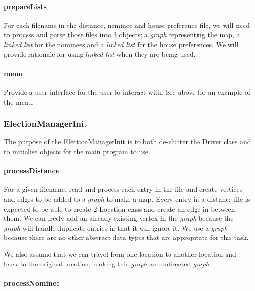 \documentclass[a4paper, 12pt, titlepage]{article}
\begin{document}
\paragraph{prepareLists} \hspace{0pt}

For each filename in the distance, nominee and house preference file, we
will need to process and parse those files into 3 objects; a \textit{graph}
representing the map, a \textit{linked list} for the nominees and a
\textit{linked list} for the house preferences. We will provide rationale
for using \textit{linked list} when they are being used.

\paragraph{menu} \hspace{0pt}

Provide a user interface for the user to interact with. See above for
an example of the menu.

\newpage

\subsubsection{ElectionManagerInit}

The purpose of the ElectionManagerInit is to both de-clutter the Driver
class and to initialise objects for the main program to use.

\paragraph{processDistance} \hspace{0pt}

For a given filename, read and process each entry in the file
and create vertices and edges to be added to a \textit{graph} to make a map.
Every entry in a distance file is expected to be able to create 2
Location class and create an edge in between them. We can freely add
an already existing vertex in the \textit{graph} because the \textit{graph}
will handle duplicate entries in that it will ignore it. We use a
\textit{graph} because there are no other abstract data types that are
appropriate for this task.

We also assume that we can travel from one location to another location
and back to the original location, making this \textit{graph} an undirected
\textit{graph}.

\paragraph{processNominee} \hspace{0pt}
\end{document}
